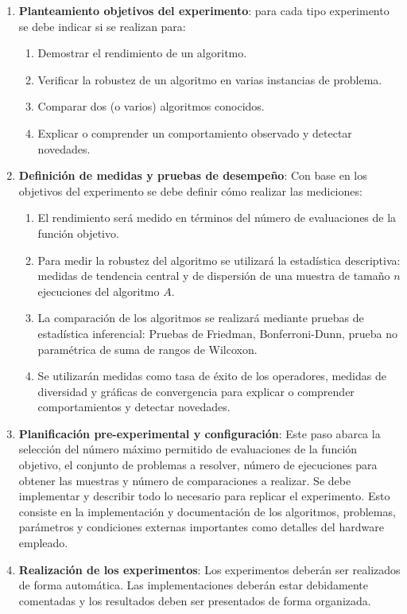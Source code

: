 \begin{enumerate}
	\item\textbf{ Planteamiento objetivos del experimento}: para cada tipo experimento se debe indicar si se realizan para:
	\begin{enumerate}
		\item Demostrar el rendimiento de un algoritmo.
		\item Verificar la robustez de un algoritmo en varias instancias de problema.
		\item Comparar dos (o varios) algoritmos conocidos.
		\item Explicar o comprender un comportamiento observado y detectar novedades. 
	\end{enumerate}
	\item \textbf{Definición de medidas y pruebas de desempeño}: Con base en los objetivos del experimento se debe definir cómo realizar las mediciones:
	\begin{enumerate}
		\item El rendimiento será medido en términos del número de evaluaciones de la función objetivo.
		\item Para medir la robustez del algoritmo se utilizará la estadística descriptiva: medidas de tendencia central y de dispersión de una muestra de tamaño $n$ ejecuciones del algoritmo $A$.
		\item La comparación de los algoritmos se realizará mediante pruebas de estadística inferencial: Pruebas de Friedman, Bonferroni-Dunn, prueba no paramétrica de suma de rangos de Wilcoxon.
		\item Se utilizarán medidas como tasa de éxito de los operadores, medidas de diversidad y gráficas de convergencia para explicar o comprender comportamientos y detectar novedades.
	\end{enumerate}
	\item \textbf{Planificación pre-experimental y configuración}: Este paso abarca la selección del número máximo permitido de evaluaciones de la función objetivo, el conjunto de problemas a resolver, número de ejecuciones para obtener las muestras y número de comparaciones a realizar. Se debe implementar y describir todo lo necesario para replicar el experimento. Esto consiste en la implementación y documentación de los algoritmos, problemas, parámetros y condiciones externas importantes como detalles del hardware empleado.
	\item \textbf{Realización de los experimentos}: Los experimentos deberán ser realizados de forma automática. Las implementaciones deberán estar debidamente comentadas y los resultados deben ser presentados de forma organizada.
	

\end{enumerate}
